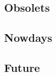 \documentclass[12pt,twoside]{article}
\theoremstyle{plain}
\theoremstyle{definition}
\theoremstyle{remark}
\begin{document}
\subsection{Obsolets}
\label{sec:obsolet}

\subsection{Nowdays}
\label{sec:nowdays}

\subsection{Future}
\label{sec:future}

%
%
\nocite{*}


\newpage


\end{document}
